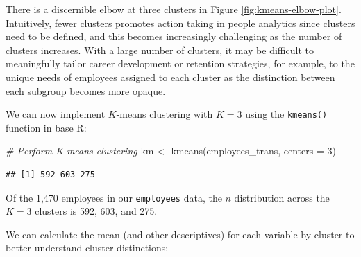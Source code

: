 \documentclass[
]{book}
\newenvironment{Shaded}{\begin{snugshade}}{\end{snugshade}}
\newcommand{\AttributeTok}[1]{\textcolor[rgb]{0.77,0.63,0.00}{#1}}
\newcommand{\CommentTok}[1]{\textcolor[rgb]{0.56,0.35,0.01}{\textit{#1}}}
\newcommand{\DecValTok}[1]{\textcolor[rgb]{0.00,0.00,0.81}{#1}}
\newcommand{\FunctionTok}[1]{\textcolor[rgb]{0.00,0.00,0.00}{#1}}
\newcommand{\NormalTok}[1]{#1}
\newcommand{\OtherTok}[1]{\textcolor[rgb]{0.56,0.35,0.01}{#1}}
\newcommand{\SpecialCharTok}[1]{\textcolor[rgb]{0.00,0.00,0.00}{#1}}
\begin{document}
There is a discernible elbow at three clusters in Figure \ref{fig:kmeans-elbow-plot}. Intuitively, fewer clusters promotes action taking in people analytics since clusters need to be defined, and this becomes increasingly challenging as the number of clusters increases. With a large number of clusters, it may be difficult to meaningfully tailor career development or retention strategies, for example, to the unique needs of employees assigned to each cluster as the distinction between each subgroup becomes more opaque.

We can now implement \(K\)-means clustering with \(K = 3\) using the \texttt{kmeans()} function in base R:

\begin{Shaded}
\begin{Highlighting}[]
\CommentTok{\# Perform K{-}means clustering}
\NormalTok{km }\OtherTok{\textless{}{-}} \FunctionTok{kmeans}\NormalTok{(employees\_trans, }\AttributeTok{centers =} \DecValTok{3}\NormalTok{)}
\end{Highlighting}
\end{Shaded}

\begin{Shaded}
\end{Shaded}

\begin{verbatim}
## [1] 592 603 275
\end{verbatim}

Of the 1,470 employees in our \texttt{employees} data, the \(n\) distribution across the \(K = 3\) clusters is 592, 603, and 275.

We can calculate the mean (and other descriptives) for each variable by cluster to better understand cluster distinctions:

\begin{Shaded}
\end{Shaded}
\end{document}
